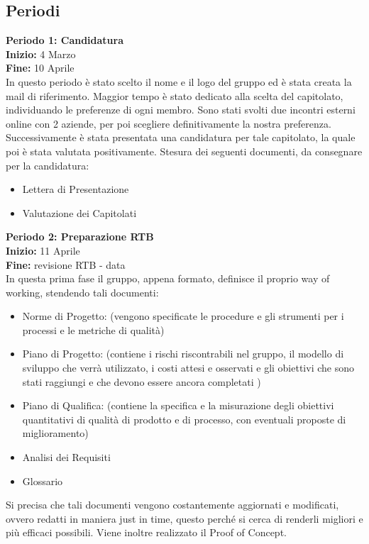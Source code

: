 \subsection{Periodi} 
{    
    \textbf{Periodo 1: Candidatura} \\
    \textbf{Inizio:} 4 Marzo \\
    \textbf{Fine:} 10 Aprile \\
    In questo periodo è stato scelto il nome e il logo del gruppo ed è stata creata la mail di riferimento. 
    Maggior tempo è stato dedicato alla scelta del capitolato, individuando le preferenze di ogni membro. 
    Sono stati svolti due incontri esterni online con 2 aziende, per poi scegliere definitivamente la nostra preferenza. 
    Successivamente è stata presentata una candidatura per tale capitolato, la quale poi è stata valutata positivamente.
    Stesura dei seguenti documenti, da consegnare per la candidatura:
    \begin{itemize}
        \item Lettera di Presentazione
        \item Valutazione dei Capitolati
    \end{itemize} 
    \textbf{Periodo 2: Preparazione RTB} \\
    \textbf{Inizio:} 11 Aprile \\
    \textbf{Fine:} revisione RTB - data \\
    In questa prima fase il gruppo, appena formato, definisce il proprio way of working, stendendo tali documenti:
    \begin{itemize} 
        \item Norme di Progetto: (vengono specificate le procedure e gli strumenti per i processi e le metriche di qualità)
        \item Piano di Progetto: (contiene i rischi riscontrabili nel gruppo, il modello di sviluppo che verrà utilizzato, i costi attesi e osservati e gli obiettivi che sono stati raggiungi e che devono essere ancora completati )
        \item Piano di Qualifica: (contiene la specifica e la misurazione degli obiettivi quantitativi di qualità di prodotto e di processo, con eventuali proposte di miglioramento)
        \item Analisi dei Requisiti
        \item Glossario
    \end{itemize} 
    Si precisa che tali documenti vengono costantemente aggiornati e modificati, ovvero redatti in maniera just in time, 
    questo perché si cerca di renderli migliori e più efficaci possibili. 
    Viene inoltre realizzato il Proof of Concept.
}
